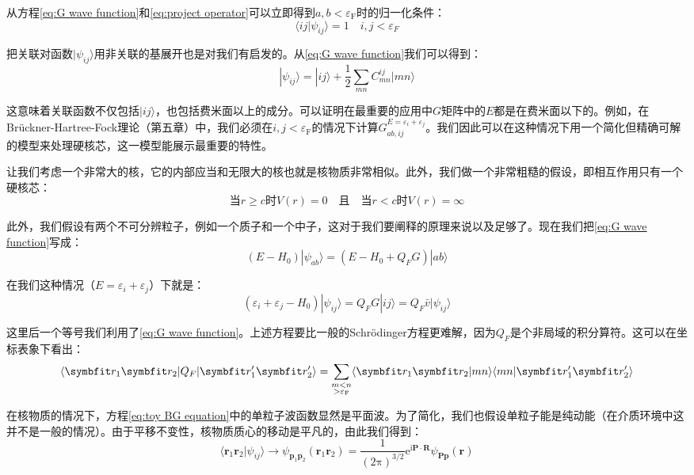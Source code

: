 从方程\ref{eq:G wave function}和\ref{eq:project operator}可以立即得到$a,b<\varepsilon_{\text{F}}$时的归一化条件：
\[
\langle ij|\psi_{ij}\rangle=1\quad i,j<\varepsilon_{F}
\]

把关联对函数$|\psi_{ij}\rangle$用非关联的基展开也是对我们有启发的。从\ref{eq:G wave function}我们可以得到：
\[
|\psi_{ij}\rangle=|ij\rangle+\frac{1}{2}\sum_{mn}C^{ij}_{mn}|mn\rangle
\]

这意味着关联函数不仅包括$|ij\rangle$，也包括费米面以上的成分。可以证明在最重要的应用中$G$矩阵中的$E$都是在费米面以下的。例如，在Brückner-Hartree-Fock理论（第五章）中，我们必须在$i,j<\varepsilon_{\text{F}}$的情况下计算$G^{E=\varepsilon_{i}+\varepsilon_{j}}_{ab,ij}$。我们因此可以在这种情况下用一个简化但精确可解的模型来处理硬核芯，这一模型能展示最重要的特性。

让我们考虑一个非常大的核，它的内部应当和无限大的核也就是核物质非常相似。此外，我们做一个非常粗糙的假设，即相互作用只有一个硬核芯：
\[
\text{当}r\geq c\text{时}V(r)=0\quad\text{且}\quad\text{当}r<c\text{时}V(r)=\infty
\]

此外，我们假设有两个不可分辨粒子，例如一个质子和一个中子，这对于我们要阐释的原理来说以及足够了。现在我们把\ref{eq:G wave function}写成：
\[
(E-H_{0})|\psi_{ab}\rangle=(E-H_{0}+Q_{F}G)|ab\rangle
\]

在我们这种情况（$E=\varepsilon_{i}+\varepsilon_{j}$）下就是：
\begin{equation}
(\varepsilon_{i}+\varepsilon_{j}-H_{0})|\psi_{ij}\rangle=Q_{F}G|ij\rangle=Q_{F}\bar{v}|\psi_{ij}\rangle\label{eq:toy BG equation}
\end{equation}

这里后一个等号我们利用了\ref{eq:G wave function}。上述方程要比一般的Schrödinger方程更难解，因为$Q_{F}$是个非局域的积分算符。这可以在坐标表象下看出：
\[
\langle\boldsymbol{r}_{1}\boldsymbol{r}_{2}|Q_{F}|\boldsymbol{r}^{\prime}_{1}\boldsymbol{r}^{\prime}_{2}\rangle=\sum_{\begin{subarray}{c}
m<n\\
>\varepsilon_{\text{F}}
\end{subarray}}\langle\boldsymbol{r}_{1}\boldsymbol{r}_{2}|mn\rangle\langle mn|\boldsymbol{r}^{\prime}_{1}\boldsymbol{r}^{\prime}_{2}\rangle
\]

在核物质的情况下，方程\ref{eq:toy BG equation}中的单粒子波函数显然是平面波。为了简化，我们也假设单粒子能是纯动能（在介质环境中这并不是一般的情况）。由于平移不变性，核物质质心的移动是平凡的，由此我们得到：
\[
\langle\boldsymbol{r}_{1}\boldsymbol{r}_{2}|\psi_{ij}\rangle\rightarrow\psi_{\boldsymbol{p}_{1}\boldsymbol{p}_{2}}(\boldsymbol{r}_{1}\boldsymbol{r}_{2})=\frac{1}{(2\mathrm{\pi})^{3/2}}\mathrm{e}^{\mathrm{i}\boldsymbol{P}\cdot\boldsymbol{R}}\psi_{\boldsymbol{P}\boldsymbol{p}}(\boldsymbol{r})
\]

